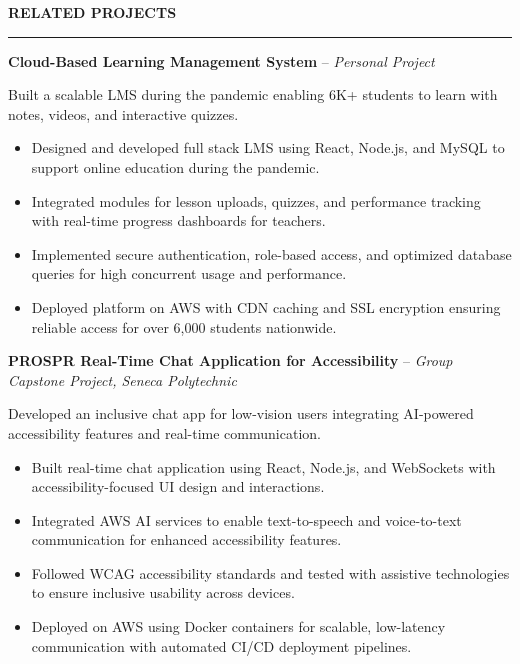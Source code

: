 \documentclass[10pt,letterpaper]{article}
\begin{document}
\vspace{6pt}

\textbf{RELATED PROJECTS}\\[-8pt]
\noindent\rule{\textwidth}{1pt}

\vspace{-2pt}

\textbf{Cloud-Based Learning Management System} -- \emph{Personal Project}

\vspace{-1pt}

Built a scalable LMS during the pandemic enabling 6K+ students to learn with notes, videos, and interactive quizzes.
\vspace{-1pt}
\begin{itemize}
\item Designed and developed full stack LMS using React, Node.js, and MySQL to support online education during the pandemic.
\item Integrated modules for lesson uploads, quizzes, and performance tracking with real-time progress dashboards for teachers.
\item Implemented secure authentication, role-based access, and optimized database queries for high concurrent usage and performance.
\item Deployed platform on AWS with CDN caching and SSL encryption ensuring reliable access for over 6,000 students nationwide.
\end{itemize}

\textbf{PROSPR  Real-Time Chat Application for Accessibility} -- \emph{Group Capstone Project, Seneca Polytechnic}

\vspace{-1pt}

Developed an inclusive chat app for low-vision users integrating AI-powered accessibility features and real-time communication.
\vspace{-1pt}
\begin{itemize}
\item Built real-time chat application using React, Node.js, and WebSockets with accessibility-focused UI design and interactions.
\item Integrated AWS AI services to enable text-to-speech and voice-to-text communication for enhanced accessibility features.
\item Followed WCAG accessibility standards and tested with assistive technologies to ensure inclusive usability across devices.
\item Deployed on AWS using Docker containers for scalable, low-latency communication with automated CI/CD deployment pipelines.
\end{itemize}
\end{document}
